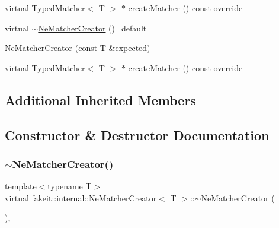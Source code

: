\begin{DoxyCompactItemize}
virtual \mbox{\hyperlink{structfakeit_1_1TypedMatcher}{Typed\+Matcher}}$<$ T $>$ $\ast$ \mbox{\hyperlink{structfakeit_1_1internal_1_1NeMatcherCreator_a5207ab2452c0d075a629b828115716cb}{create\+Matcher}} () const override
\item 
virtual \mbox{\hyperlink{structfakeit_1_1internal_1_1NeMatcherCreator_a8a1d7213f8e7611867a812de3e4310a9}{$\sim$\+Ne\+Matcher\+Creator}} ()=default
\item 
\mbox{\hyperlink{structfakeit_1_1internal_1_1NeMatcherCreator_a15ad0bf386a46786631d4f46b730e646}{Ne\+Matcher\+Creator}} (const T \&expected)
\item 
virtual \mbox{\hyperlink{structfakeit_1_1TypedMatcher}{Typed\+Matcher}}$<$ T $>$ $\ast$ \mbox{\hyperlink{structfakeit_1_1internal_1_1NeMatcherCreator_a5207ab2452c0d075a629b828115716cb}{create\+Matcher}} () const override
\end{DoxyCompactItemize}
\subsection*{Additional Inherited Members}


\subsection{Constructor \& Destructor Documentation}
\mbox{\label{structfakeit_1_1internal_1_1NeMatcherCreator_a8a1d7213f8e7611867a812de3e4310a9}} 
\subsubsection{\texorpdfstring{$\sim$NeMatcherCreator()}{~NeMatcherCreator()}\hspace{0.1cm}{\footnotesize\ttfamily [1/9]}}
{\footnotesize\ttfamily template$<$typename T$>$ \\
virtual \mbox{\hyperlink{structfakeit_1_1internal_1_1NeMatcherCreator}{fakeit\+::internal\+::\+Ne\+Matcher\+Creator}}$<$ T $>$\+::$\sim$\mbox{\hyperlink{structfakeit_1_1internal_1_1NeMatcherCreator}{Ne\+Matcher\+Creator}} (\begin{DoxyParamCaption}{ }\end{DoxyParamCaption})\hspace{0.3cm}{\ttfamily [virtual]}, {\ttfamily [default]}}

